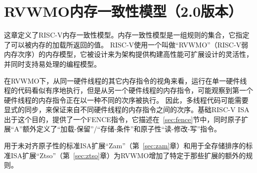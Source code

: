 \chapter{RVWMO内存一致性模型（2.0版本）}
\label{ch:memorymodel}

这章定义了RISC-V内存一致性模型。内存一致性模型是一组规则的集合，它指定了可以被内存的加载所返回的值。
RISC-V使用一个叫做“RVWMO”（RISC-V弱内存次序）的内存模型，它被设计来为架构提供构建高性能可扩展设计的灵活性，
并同时支持易处理的编程模型。

在RVWMO下，从同一硬件线程的其它内存指令的视角来看，运行在单一硬件线程的代码看似有序地执行，但是从另一个硬件线程的内存指令，可能观察到第一个硬件线程的内存指令正在以一种不同的次序被执行。
因此，多线程代码可能需要显式的同步，来保证来自不同硬件线程的内存指令之间的次序。基础RISC-V ISA出于这个目的，提供了一个FENCE指令，它描述在~\ref{sec:fence}节中，同时原子扩展“A”额外定义了“加载-保留”/“存储-条件”和原子性“读-修改-写”指令。

用于未对齐原子性的标准ISA扩展“Zam”（第~\ref{sec:zam}章）和用于全存储排序的标准ISA扩展“Ztso”（第~\ref{sec:ztso}章）为RVWMO增加了特定于那些扩展的额外的规则。

